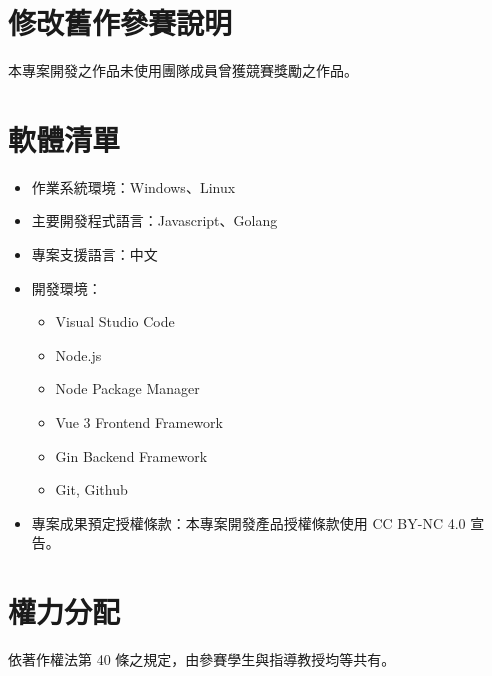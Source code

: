 \documentclass[12pt]{article}
\begin{document}
\section{修改舊作參賽說明}
  本專案開發之作品未使用團隊成員曾獲競賽獎勵之作品。
\section{軟體清單}
\begin{itemize}
  \item 作業系統環境：Windows、Linux
  \item 主要開發程式語言：Javascript、Golang
  \item 專案支援語言：中文
  \item 開發環境：
  \begin{itemize}
    \item Visual Studio Code
    \item Node.js
    \item Node Package Manager
    \item Vue 3 Frontend Framework
    \item Gin Backend Framework
    \item Git, Github
  \end{itemize}
  \item 專案成果預定授權條款：本專案開發產品授權條款使用 CC BY-NC 4.0 宣告。
\end{itemize}

\section{權力分配}
依著作權法第 40 條之規定，由參賽學生與指導教授均等共有。

\end{document}
